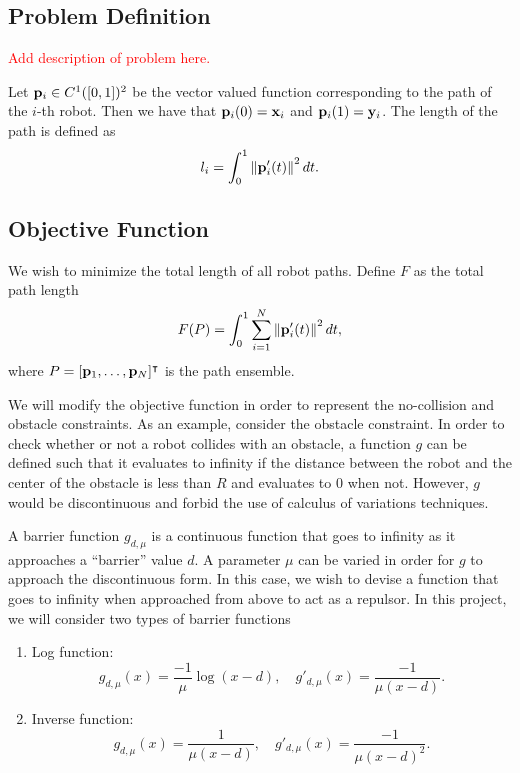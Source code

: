 \documentclass[11pt]{article}
\begin{document}
\subsection{Problem Definition}

\textcolor{red}{Add description of problem here.}

Let \(\mathbf{p}_i \in C^1([0,1])^2\) be the vector valued function corresponding to the path of the \(i\)-th robot. Then we have that \(\mathbf{p}_i(0) = \mathbf{x}_i\) and \(\mathbf{p}_i(1) = \mathbf{y}_i\). The length of the path is defined as
\begin{equation}
    l_i = \int_0^1 \left\lVert \mathbf{p}_i'(t) \right\rVert^2 dt.
\end{equation}

\subsection{Objective Function}

We wish to minimize the total length of all robot paths. Define \(F\) as the total path length
\begin{equation}
    F(P) = \int_0^1 \sum_{i=1}^{N} \left\lVert \mathbf{p}_i'(t) \right\rVert^2 dt,
\end{equation}
where \(P = [\mathbf{p}_1, \ldots, \mathbf{p}_N]^\intercal\) is the path ensemble.

We will modify the objective function in order to represent the no-collision and obstacle constraints. As an example, consider the obstacle constraint. In order to check whether or not a robot collides with an obstacle, a function \(g\) can be defined such that it evaluates to infinity if the distance between the robot and the center of the obstacle is less than \(R\) and evaluates to 0 when not. However, \(g\) would be discontinuous and forbid the use of calculus of variations techniques.

A barrier function \(g_{d,\mu}\) is a continuous function that goes to infinity as it approaches a ``barrier'' value \(d\). A parameter \(\mu\) can be varied in order for \(g\) to approach the discontinuous form. In this case, we wish to devise a function that goes to infinity when approached from above to act as a repulsor. In this project, we will consider two types of barrier functions
\begin{enumerate}
    \item Log function:
    \begin{equation}
        g_{d,\mu}(x) = \frac{-1}{\mu} \log(x-d),
        \quad
        g'_{d,\mu}(x) = \frac{-1}{\mu(x-d)}.
    \end{equation}
    \item Inverse function:
    \begin{equation}
        g_{d,\mu}(x) = \frac{1}{\mu(x-d)},
        \quad
        g'_{d,\mu}(x) = \frac{-1}{\mu(x-d)^2}.
    \end{equation}
\end{enumerate}
\end{document}
